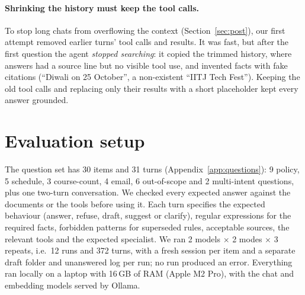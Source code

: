 \documentclass[10pt,a4paper]{article}
\begin{document}
\paragraph{Shrinking the history must keep the tool calls.}
To stop long chats from overflowing the context (Section~\ref{sec:post}), our first attempt removed earlier turns'
tool calls and results. It was fast, but after the first question the agent \emph{stopped searching}: it copied the
trimmed history, where answers had a source line but no visible tool use, and invented facts with fake citations
(``Diwali on 25 October'', a non-existent ``IITJ Tech Fest''). Keeping the old tool calls and replacing only their
results with a short placeholder kept every answer grounded.

\section{Evaluation setup}
The question set has 30 items and 31 turns (Appendix~\ref{app:questions}): 9 policy, 5 schedule, 3 course-count,
4 email, 6 out-of-scope and 2 multi-intent questions, plus one two-turn conversation. We checked every expected
answer against the documents or the tools before using it. Each turn specifies the expected behaviour (answer,
refuse, draft, suggest or clarify), regular expressions for the required facts, forbidden patterns for superseded
rules, acceptable sources, the relevant tools and the expected specialist. We ran 2 models $\times$ 2 modes $\times$
3 repeats, i.e.\ 12 runs and 372 turns, with a fresh session per item and a separate draft folder and unanswered log
per run; no run produced an error. Everything ran locally on a laptop with 16\,GB of RAM (Apple M2 Pro), with the
chat and embedding models served by Ollama.
\end{document}
